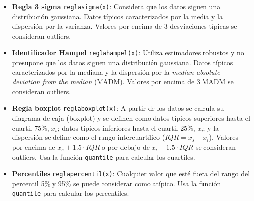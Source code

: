 \documentclass[
]{article}
\begin{document}
\begin{itemize}
\item
  \textbf{Regla 3 sigma} \texttt{reglasigma(x)}: Considera que los datos
  siguen una distribución gaussiana. Datos típicos caracterizados por la
  media y la dispersión por la varianza. Valores por encima de 3
  desviaciones típicas se consideran outliers.
\item
  \textbf{Identificador Hampel} \texttt{reglahampel(x)}: Utiliza
  estimadores robustos y no presupone que los datos siguen una
  distribución gaussiana. Datos típicos caracterizados por la mediana y
  la dispersión por la \emph{median absolute deviation from the median}
  (MADM). Valores por encima de 3 MADM se consideran outliers.
\item
  \textbf{Regla boxplot} \texttt{reglaboxplot(x)}: A partir de los datos
  se calcula su diagrama de caja (boxplot) y se definen como datos
  típicos superiores hasta el cuartil 75\%, \(x_s\); datos típicos
  inferiores hasta el cuartil 25\%, \(x_i\); y la dispersión se define
  como el rango intercuartílico (\(IQR= x_s-x_i\)). Valores por encima
  de \(x_s+1.5\cdot IQR\) o por debajo de \(x_i-1.5\cdot IQR\) se
  consideran outliers. Usa la función \texttt{quantile} para calcular
  los cuartiles.
\item
  \textbf{Percentiles} \texttt{reglapercentil(x)}: Cualquier valor que
  esté fuera del rango del percentil 5\% y 95\% se puede considerar como
  atípico. Usa la función \texttt{quantile} para calcular los
  percentiles.
\end{itemize}
\end{document}
